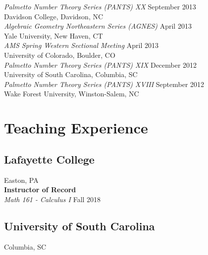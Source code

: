 \documentclass{article}
\begin{document}
  \noindent\textsl{Palmetto Number Theory Series (PANTS) XX} \hfill September 2013\\
  Davidson College, Davidson, NC\\
  
  \noindent\textsl{Algebraic Geometry Northeastern Series (AGNES)} \hfill April 2013\\
  Yale University, New Haven, CT\\

  \noindent\textsl{AMS Spring Western Sectional Meeting} \hfill April 2013\\
  University of Colorado, Boulder, CO\\

  \noindent\textsl{Palmetto Number Theory Series (PANTS) XIX} \hfill December 2012\\
  University of South Carolina, Columbia, SC\\

  \noindent\textsl{Palmetto Number Theory Series (PANTS) XVIII} \hfill September 2012\\
  Wake Forest University, Winston-Salem, NC\\

  \section*{Teaching Experience}
  \subsection*{Lafayette College}
\noindent Easton, PA\\

\noindent\textbf{Instructor of Record}\\
\textsl{Math 161 - Calculus I} \hfill Fall 2018\\

  \subsection*{University of South Carolina}
  \noindent Columbia, SC\\
  
\end{document}
